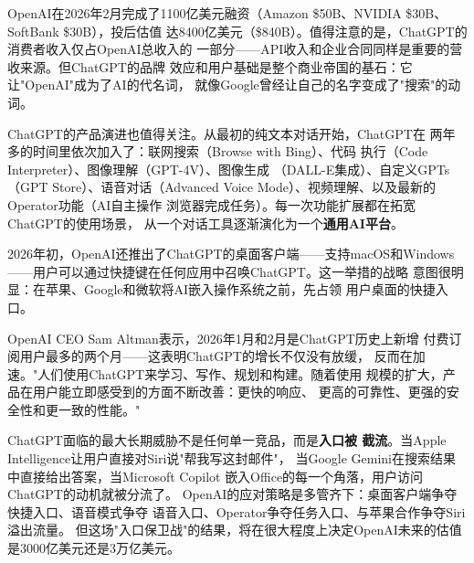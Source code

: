 OpenAI在2026年2月完成了1100亿美元融资（Amazon \$50B、NVIDIA \$30B、SoftBank \$30B），投后估值
达8400亿美元（\$840B）。值得注意的是，ChatGPT的消费者收入仅占OpenAI总收入的
一部分——API收入和企业合同同样是重要的营收来源。但ChatGPT的品牌
效应和用户基础是整个商业帝国的基石：它让"OpenAI"成为了AI的代名词，
就像Google曾经让自己的名字变成了"搜索"的动词。

ChatGPT的产品演进也值得关注。从最初的纯文本对话开始，ChatGPT在
两年多的时间里依次加入了：联网搜索（Browse with Bing）、代码
执行（Code Interpreter）、图像理解（GPT-4V）、图像生成
（DALL-E集成）、自定义GPTs（GPT Store）、语音对话（Advanced
Voice Mode）、视频理解、以及最新的Operator功能（AI自主操作
浏览器完成任务）。每一次功能扩展都在拓宽ChatGPT的使用场景，
从一个对话工具逐渐演化为一个\textbf{通用AI平台}。

2026年初，OpenAI还推出了ChatGPT的桌面客户端——支持macOS和Windows
——用户可以通过快捷键在任何应用中召唤ChatGPT。这一举措的战略
意图很明显：在苹果、Google和微软将AI嵌入操作系统之前，先占领
用户桌面的快捷入口。

OpenAI CEO Sam Altman表示，2026年1月和2月是ChatGPT历史上新增
付费订阅用户最多的两个月——这表明ChatGPT的增长不仅没有放缓，
反而在加速。"人们使用ChatGPT来学习、写作、规划和构建。随着使用
规模的扩大，产品在用户能立即感受到的方面不断改善：更快的响应、
更高的可靠性、更强的安全性和更一致的性能。"

ChatGPT面临的最大长期威胁不是任何单一竞品，而是\textbf{入口被
截流}。当Apple Intelligence让用户直接对Siri说"帮我写这封邮件"，
当Google Gemini在搜索结果中直接给出答案，当Microsoft Copilot
嵌入Office的每一个角落，用户访问ChatGPT的动机就被分流了。
OpenAI的应对策略是多管齐下：桌面客户端争夺快捷入口、语音模式争夺
语音入口、Operator争夺任务入口、与苹果合作争夺Siri溢出流量。
但这场"入口保卫战"的结果，将在很大程度上决定OpenAI未来的估值
是3000亿美元还是3万亿美元。

